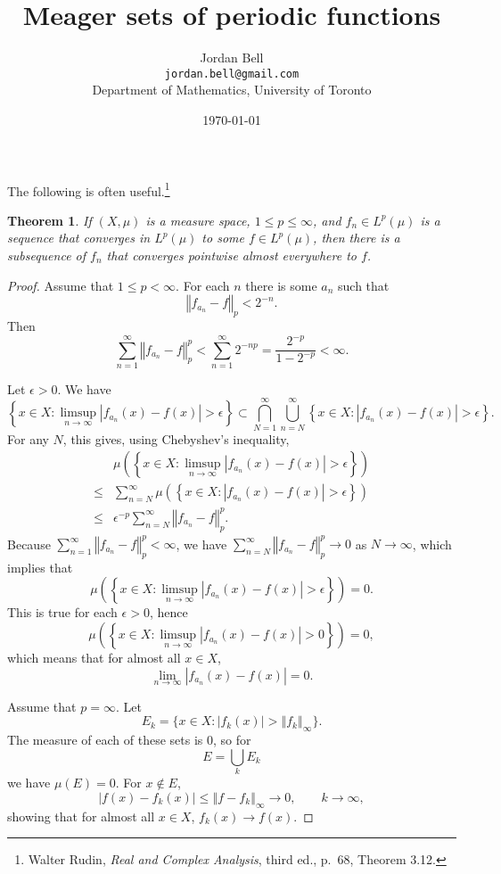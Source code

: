 \documentclass{article}
\newcommand{\norm}[1]{\left\Vert #1 \right\Vert}
\newtheorem{theorem}{Theorem}
\theoremstyle{definition}
\begin{document}
\title{Meager sets of periodic functions}
\author{Jordan Bell\\ \texttt{jordan.bell@gmail.com}\\Department of Mathematics, University of Toronto}
\date{\today}

\maketitle

The following is often useful.\footnote{Walter Rudin, {\em Real and Complex Analysis}, third ed.,
p.~68, Theorem 3.12.}

\begin{theorem}
If $(X,\mu)$ is a measure space, $1 \leq p \leq \infty$, and $f_n \in L^p(\mu)$ is a sequence
that converges in $L^p(\mu)$ to some $f \in L^p(\mu)$, then there is a subsequence
of $f_n$ that converges pointwise almost everywhere to $f$.
\end{theorem}
\begin{proof}
Assume that $1 \leq p < \infty$. For each $n$ there is some $a_n$ such that
\[
\norm{f_{a_n}-f}_p < 2^{-n}.
\]
Then
\[
\sum_{n=1}^\infty \norm{f_{a_n}-f}_p^p  < \sum_{n=1}^\infty 2^{-np}
= \frac{2^{-p}}{1-2^{-p}}<\infty.
\]

Let $\epsilon>0$. We have
\[
\left\{x \in X: \limsup_{n \to \infty} |f_{a_n}(x)-f(x)|>\epsilon\right\}
\subset \bigcap_{N=1}^\infty \bigcup_{n = N}^\infty \left\{x \in X: |f_{a_n}(x)-f(x)|>\epsilon\right\}.
\]
For any $N$, this gives, using Chebyshev's inequality, 
\[
\begin{split}
&\mu\left(\left\{x \in X: \limsup_{n \to \infty} |f_{a_n}(x)-f(x)|>\epsilon\right\}\right)\\
\leq&
\sum_{n=N}^\infty \mu\left( \left\{x \in X: |f_{a_n}(x)-f(x)|>\epsilon\right\}\right)\\
\leq& \epsilon^{-p}  \sum_{n=N}^\infty\norm{f_{a_n}-f}_p^p.
\end{split}
\]
Because $\sum_{n=1}^\infty \norm{f_{a_n}-f}_p^p<\infty$,  we have
$\sum_{n=N}^\infty\norm{f_{a_n}-f}_p^p \to 0$ as $N \to \infty$, which implies that
\[
\mu\left(\left\{x \in X: \limsup_{n \to \infty} |f_{a_n}(x)-f(x)|>\epsilon\right\}\right)
=0.
\]
This is true for each $\epsilon>0$, hence
\[
\mu\left(\left\{x \in X: \limsup_{n \to \infty} |f_{a_n}(x)-f(x)|>0\right\}\right)=0,
\]
which means that for almost all $x \in X$,
\[
\lim_{n \to \infty} |f_{a_n}(x)-f(x)| =0.
\]

Assume that $p=\infty$. Let
\[
E_k = \{x \in X: |f_k(x)|>\norm{f_k}_\infty\}.
\]
The measure of each of these sets is $0$, so for
\[
E = \bigcup_k E_k
\]
we have $\mu(E)=0$.
For $x \not \in E$,
\[
|f(x)-f_k(x)| \leq \norm{f-f_k}_\infty \to 0, \qquad k \to \infty,
\]
showing that for almost all $x \in X$, $f_k(x) \to f(x)$.
\end{proof}
\end{document}
